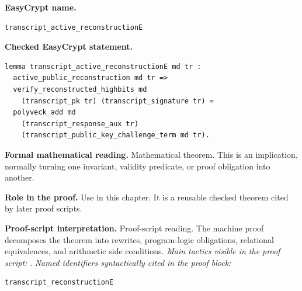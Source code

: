\begin{formaltheorem}
\noindent\textbf{EasyCrypt name.}
\begin{lstlisting}[language=EasyCrypt,basicstyle=\ttfamily\scriptsize]
transcript_active_reconstructionE
\end{lstlisting}
\noindent\textbf{Checked EasyCrypt statement.}
\begin{lstlisting}[language=EasyCrypt,basicstyle=\ttfamily\scriptsize]
lemma transcript_active_reconstructionE md tr :
  active_public_reconstruction md tr =>
  verify_reconstructed_highbits md
    (transcript_pk tr) (transcript_signature tr) =
  polyveck_add md
    (transcript_response_aux tr)
    (transcript_public_key_challenge_term md tr).
\end{lstlisting}
\noindent\textbf{Formal mathematical reading.}
Mathematical theorem. This is an implication, normally turning one invariant, validity predicate, or proof obligation into another.

\noindent\textbf{Role in the proof.}
Use in this chapter. It is a reusable checked theorem cited by later proof scripts.

\noindent\textbf{Proof-script interpretation.}
Proof-script reading. The machine proof decomposes the theorem into rewrites, program-logic obligations, relational equivalences, and arithmetic side conditions.
\emph{Main tactics visible in the proof script:} .
\emph{Named identifiers syntactically cited in the proof block:}
\begin{lstlisting}[language=EasyCrypt,basicstyle=\ttfamily\scriptsize]
transcript_reconstructionE
\end{lstlisting}

\end{formaltheorem}

